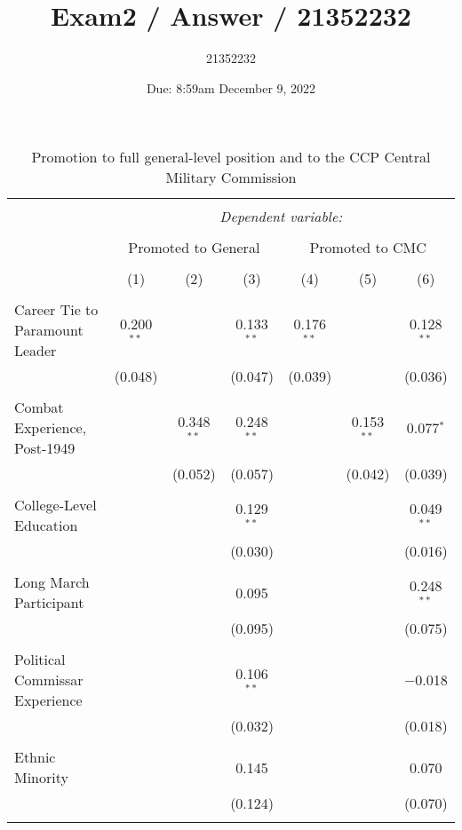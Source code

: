 \documentclass[12pt,letterpaper]{article}
\title{Exam2 / Answer / 21352232}
\date{Due: 8:59am December 9, 2022}
\author{21352232}
\begin{document}
	
	
\begin{table}[!htbp] \centering 
  \caption{Promotion to full general-level position and to the CCP Central Military Commission} 
  \label{main_results} 
\begin{tabular}{@{\extracolsep{5pt}}lcccccc} 
\\[-1.8ex]\hline 
\hline \\[-1.8ex] 
 & \multicolumn{6}{c}{\textit{Dependent variable:}} \\ 
\cline{2-7} 
\\[-1.8ex] & \multicolumn{3}{c}{Promoted to General} & \multicolumn{3}{c}{Promoted to CMC} \\ 
\\[-1.8ex] & (1) & (2) & (3) & (4) & (5) & (6)\\ 
\hline \\[-1.8ex] 
 Career Tie to Paramount Leader & 0.200$^{**}$ &  & 0.133$^{**}$ & 0.176$^{**}$ &  & 0.128$^{**}$ \\ 
  & (0.048) &  & (0.047) & (0.039) &  & (0.036) \\ 
  & & & & & & \\ 
 Combat Experience, Post-1949 &  & 0.348$^{**}$ & 0.248$^{**}$ &  & 0.153$^{**}$ & 0.077$^{*}$ \\ 
  &  & (0.052) & (0.057) &  & (0.042) & (0.039) \\ 
  & & & & & & \\ 
 College-Level Education &  &  & 0.129$^{**}$ &  &  & 0.049$^{**}$ \\ 
  &  &  & (0.030) &  &  & (0.016) \\ 
  & & & & & & \\ 
 Long March Participant &  &  & 0.095 &  &  & 0.248$^{**}$ \\ 
  &  &  & (0.095) &  &  & (0.075) \\ 
  & & & & & & \\ 
 Political Commissar Experience &  &  & 0.106$^{**}$ &  &  & $-$0.018 \\ 
  &  &  & (0.032) &  &  & (0.018) \\ 
  & & & & & & \\ 
 Ethnic Minority &  &  & 0.145 &  &  & 0.070 \\ 
  &  &  & (0.124) &  &  & (0.070) \\ 
  & & & & & & \\ 

\end{tabular}
\end{table}
\end{document}
